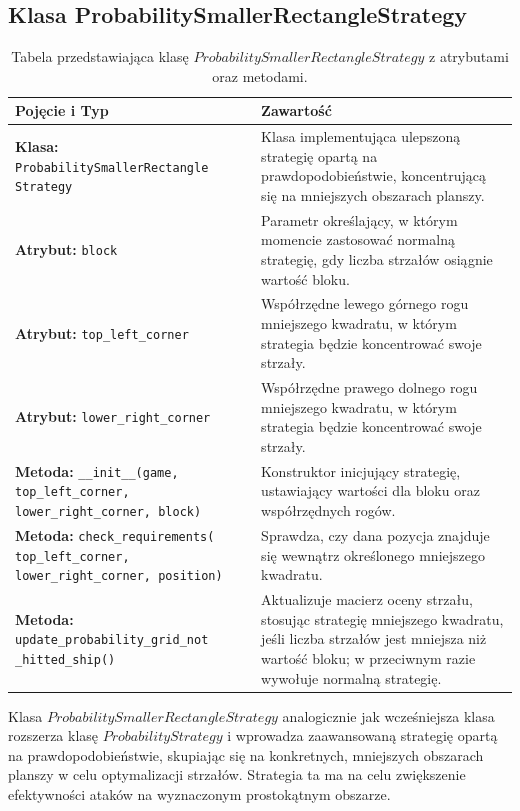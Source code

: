 \documentclass[magisterska]{pracadypl}
\begin{document}
{\subsection{Klasa ProbabilitySmallerRectangleStrategy}
\begin{table}[H]
\centering
\begin{tabularx}{\textwidth}{|p{6cm}|X|}
\hline
\textbf{Pojęcie i Typ} & \textbf{Zawartość} \\ \hline
\textbf{Klasa:} \texttt{ProbabilitySmallerRectangle Strategy} & Klasa implementująca ulepszoną strategię opartą na prawdopodobieństwie, koncentrującą się na mniejszych obszarach planszy. \\ \hline
\textbf{Atrybut:} \texttt{block} & Parametr określający, w którym momencie zastosować normalną strategię, gdy liczba strzałów osiągnie wartość bloku. \\ \hline
\textbf{Atrybut:} \texttt{top\_left\_corner} & Współrzędne lewego górnego rogu mniejszego kwadratu, w którym strategia będzie koncentrować swoje strzały. \\ \hline
\textbf{Atrybut:} \texttt{lower\_right\_corner} & Współrzędne prawego dolnego rogu mniejszego kwadratu, w którym strategia będzie koncentrować swoje strzały. \\ \hline
\textbf{Metoda:} \texttt{\_\_init\_\_(game, top\_left\_corner, lower\_right\_corner, block)} & Konstruktor inicjujący strategię, ustawiający wartości dla bloku oraz współrzędnych rogów. \\ \hline
\textbf{Metoda:} \texttt{check\_requirements( top\_left\_corner, lower\_right\_corner, position)} & Sprawdza, czy dana pozycja znajduje się wewnątrz określonego mniejszego kwadratu. \\ \hline
\textbf{Metoda:} \texttt{update\_probability\_grid\_not \_hitted\_ship()} & Aktualizuje macierz oceny strzału, stosując strategię mniejszego kwadratu, jeśli liczba strzałów jest mniejsza niż wartość bloku; w przeciwnym razie wywołuje normalną strategię. \\ \hline
\end{tabularx}
\caption{Tabela przedstawiająca klasę $ProbabilitySmallerRectangleStrategy$ z atrybutami oraz metodami.}
\end{table}
Klasa $ProbabilitySmallerRectangleStrategy$ analogicznie jak wcześniejsza klasa rozszerza klasę $ProbabilityStrategy$ i wprowadza zaawansowaną strategię opartą na prawdopodobieństwie, skupiając się na konkretnych, mniejszych obszarach planszy w celu optymalizacji strzałów. Strategia ta ma na celu zwiększenie efektywności ataków na wyznaczonym prostokątnym obszarze.
}
\end{document}
